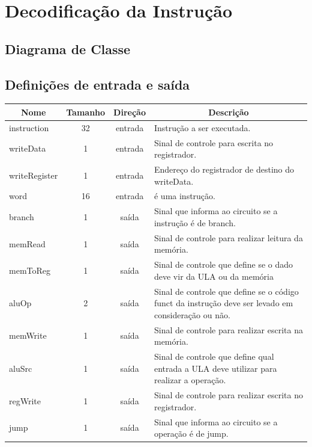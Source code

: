 \section{Decodificação da Instrução}
	\subsection{Diagrama de Classe}
  \begin{figure}[H]
    
  \end{figure}
		
		\subsection{Definições de entrada e saída}
		
	\begin{center}
		\begin{longtable}[pos]{| l | c | c | m{7cm} |} \hline
			\multicolumn{1}{|c|}{\cellcolor[gray]{0.9}\textbf{Nome}} & 
			\multicolumn{1}{c|}{\cellcolor[gray]{0.9}\textbf{Tamanho}} & 
			\multicolumn{1}{c|}{\cellcolor[gray]{0.9}\textbf{Direção}} &
			\multicolumn{1}{c|}{\cellcolor[gray]{0.9}\textbf{Descrição}} \\ \hline
			\endhead
			\hline
			\endlastfoot
			
			instruction & 32 & entrada & Instrução a ser executada. \\ \hline
			writeData & 1 & entrada & Sinal de controle para escrita no registrador. \\ \hline
			writeRegister & 1 & entrada & Endereço do registrador de destino do writeData. \\ \hline
			word & 16 & entrada & é uma instrução. \\ \hline
			branch & 1 & saída & Sinal que informa ao circuito se a instrução é de branch. \\ \hline
			memRead & 1 & saída & Sinal de controle para realizar leitura da memória. \\ \hline
			memToReg & 1 & saída & Sinal de controle que define se o dado deve vir da ULA ou da memória \\ \hline
			aluOp & 2 & saída & Sinal de controle que define se o código funct da instrução deve ser levado em consideração ou não. \\ \hline
			memWrite & 1 & saída & Sinal de controle para realizar escrita na memória. \\ \hline
			aluSrc & 1 & saída & Sinal de controle que define qual entrada a ULA deve utilizar para realizar a operação. \\ \hline
			regWrite & 1 & saída & Sinal de controle para realizar escrita no registrador. \\ \hline
			jump & 1 & saída & Sinal que informa ao circuito se a operação é de jump. \\ \hline
		\end{longtable}
	\end{center}
    

